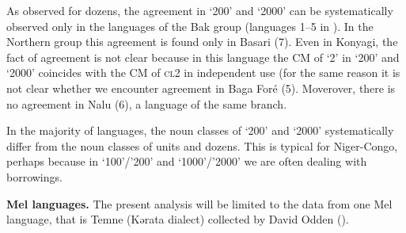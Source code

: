 \begin{table}
\caption{\label{tab:1:14} Agreement in `200' and `2000'}

\end{table}


As observed for dozens, the agreement in ‘200’ and ‘2000’ can be systematically observed only in the languages of the Bak group (languages 1--5 in ). In the Northern group this agreement is found only in Basari (7). Even in Konyagi, the fact of agreement is not clear because in this language the CM of ‘2’ in ‘200’ and ‘2000’ coincides with the CM of \textsc{cl}2 in independent use (for the same reason it is not clear whether we encounter agreement in Baga Foré (5). Moverover, there is no agreement in Nalu (6), a language of the same branch. 

In the majority of languages, the noun classes of ‘200’ and ‘2000’ systematically differ from the noun classes of units and dozens. This is typical for Niger-Congo, perhaps because in ‘100’/’200’ and ‘1000’/’2000’ we are often dealing with borrowings.

\textbf{Mel languages.} The present analysis will be limited to the data from one Mel language, that is Temne (Kərata dialect) collected by David Odden ().


